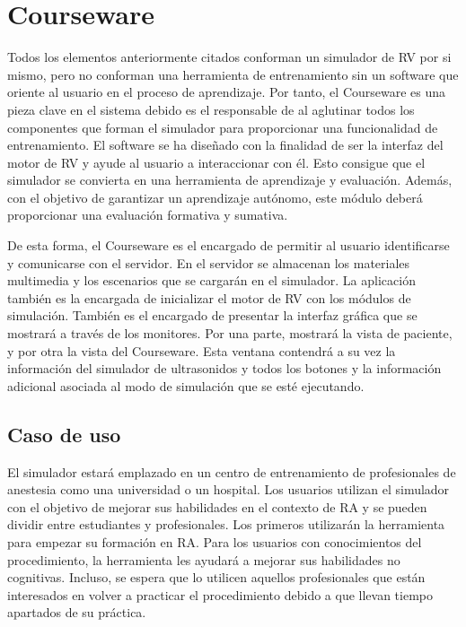 \section{Courseware}
\label{rasim:courseware}
Todos los elementos anteriormente citados conforman un simulador de \ac{RV} por si mismo, pero no conforman una herramienta de entrenamiento sin un software que oriente al usuario en el proceso de aprendizaje. Por tanto, el \ac{Courseware} es una pieza clave en el sistema debido es el responsable de al aglutinar todos los componentes que forman el simulador para proporcionar una funcionalidad de entrenamiento. El software se ha diseñado con la finalidad de ser la interfaz del motor de \ac{RV} y ayude al usuario a interaccionar con él. Esto consigue que el simulador se convierta en una herramienta de aprendizaje y evaluación. Además, con el objetivo de garantizar un aprendizaje autónomo, este módulo deberá proporcionar una evaluación formativa y sumativa.

De esta forma, el \ac{Courseware} es el encargado de permitir al usuario identificarse y comunicarse con el servidor. En el servidor se almacenan los materiales multimedia y los escenarios que se cargarán en el simulador. La aplicación también es la encargada de inicializar el motor de \ac{RV} con los módulos de simulación. También es el encargado de presentar la interfaz gráfica que se mostrará a través de los monitores. Por una parte, mostrará la vista de paciente, y por otra la vista del \ac{Courseware}. Esta ventana contendrá a su vez la información del simulador de ultrasonidos y todos los botones y la información adicional asociada al modo de simulación que se esté ejecutando.



\subsection{Caso de uso}
\label{course:casodeuso}
El simulador estará emplazado en un centro de entrenamiento de profesionales de anestesia como una universidad o un hospital. Los usuarios utilizan el simulador con el objetivo de mejorar sus habilidades en el contexto de \ac{RA} y se pueden dividir entre estudiantes y profesionales. Los primeros utilizarán la herramienta para empezar su formación en \ac{RA}. Para los usuarios con conocimientos del procedimiento, la herramienta les ayudará a mejorar sus habilidades no cognitivas. Incluso, se espera que lo utilicen aquellos profesionales que están interesados en volver a practicar el procedimiento debido a que llevan tiempo apartados de su práctica.


